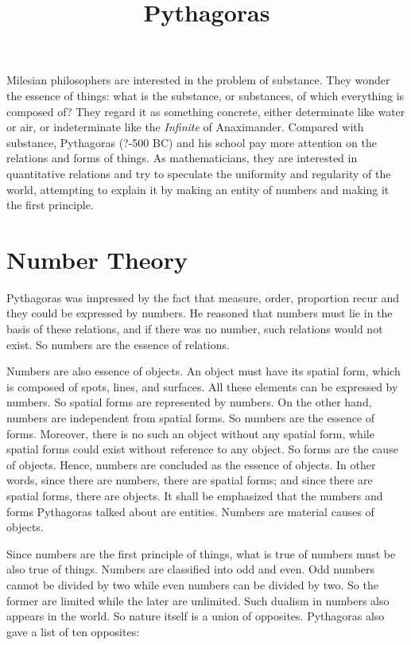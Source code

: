 \documentclass[11pt]{article}
\title{Pythagoras}
\date{}
\begin{document}
\begin{sloppypar}
  \maketitle

  \linenumbers
  
Milesian philosophers are interested in the problem of substance. 
They wonder the essence of things: what is the substance, or substances, of which everything is composed of? 
They regard it as something concrete, either determinate like water or air, or indeterminate like the \textit{Infinite} of Anaximander. 
Compared with substance, Pythagoras (?-500 BC) and his school pay more attention on the relations and forms of things. 
As mathematicians, they are interested in quantitative relations and try to speculate the uniformity and regularity of the world, attempting to explain it by making an entity of numbers and making it the first principle.

\section{Number Theory}
Pythagoras was impressed by the fact that measure, order, proportion recur and they could be expressed by numbers. 
He reasoned that numbers must lie in the basis of these relations, and if there was no number, such relations would not exist. 
So numbers are the essence of relations.

\par

Numbers are also essence of objects. 
An object must have its spatial form, which is composed of spots, lines, and surfaces. 
All these elements can be expressed by numbers. 
So spatial forms are represented by numbers. 
On the other hand, numbers are independent from spatial forms. 
So numbers are the essence of forms. 
Moreover, there is no such an object without any spatial form, while spatial forms could exist without reference to any object. 
So forms are the cause of objects. 
Hence, numbers are concluded as the essence of objects. 
In other words, since there are numbers, there are spatial forms; and since there are spatial forms, there are objects. 
It shall be emphasized that the numbers and forms Pythagoras talked about are entities. 
Numbers are material causes of objects. 

\par

Since numbers are the first principle of things, what is true of numbers must be also true of things. 
Numbers are classified into odd and even. 
Odd numbers cannot be divided by two while even numbers can be divided by two. 
So the former are limited while the later are unlimited. 
Such dualism in numbers also appears in the world. 
So nature itself is a union of opposites. 
Pythagoras also gave a list of ten opposites:


\end{sloppypar}
\end{document}
